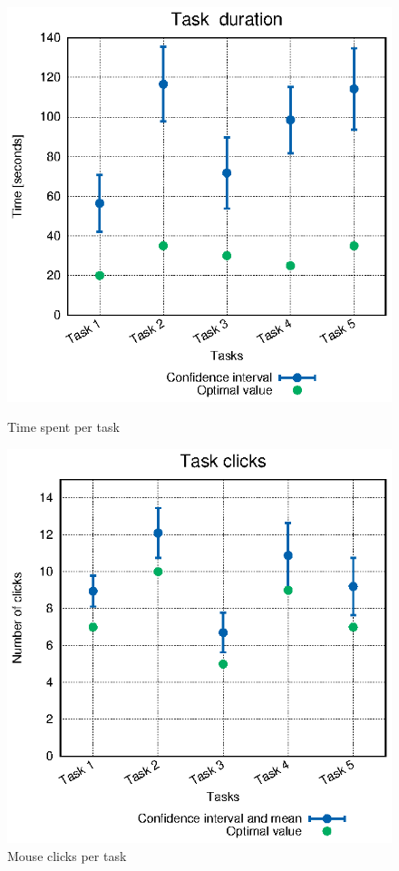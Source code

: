 \begin{figure}
\centering
\begin{minipage}{.5\textwidth}
  \centering
    \includegraphics[width=\textwidth]{stats/user_times.eps}
    \caption{Time spent per task}
    \label{fig:user_times}
\end{minipage}%
\begin{minipage}{.5\textwidth}
  \centering
    \includegraphics[width=\textwidth]{stats/user_clicks.eps}
    \caption{Mouse clicks per task}
    \label{fig:user_clicks}
\end{minipage}
\end{figure}



